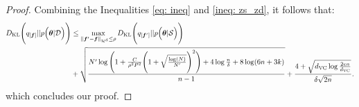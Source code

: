 \begin{proof}




Combining the Inequalities \ref{eq: ineq} and \ref{ineq: zs_zd}, it follows that:
\begin{align*}
    D_{\mathrm{KL}}\Bigg(q_{[{\bm{f}}]} || p\Big({\bm{\theta}}|{\mathcal{D}}\Big)\Bigg) &\leq \max_{\|{\bm{f}}' - {\bm{f}}\|_{{\mathcal{H}}^d} \leq \rho}D_{\mathrm{KL}}\Bigg(q_{[{\bm{f}}']} || p\Big({\bm{\theta}} | {\mathcal{S}}\Big)\Bigg)\\
         &+ \sqrt{\frac{N' \log \Bigg(1 + \frac{C}{\rho^2 P^2}\Bigg(1+ \sqrt{\frac{\log(N)}{N'}}\Bigg)^2 \Bigg)+4\log\frac{n}{\delta}+8\log(6n+3k)}{n-1}} + \frac{4+\sqrt{d_{\mathrm{VC}}\log\frac{2en}{d_{\mathrm{VC}}}}}{\delta\sqrt{2n}}.
\end{align*}
which concludes our proof.
\end{proof}
